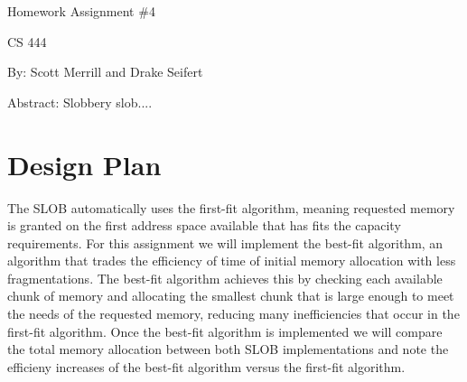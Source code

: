 \documentclass[onecolumn, draftclsnofoot,10pt, compsoc]{IEEEtran}
\def \ClassName {CS 444}
\def \AuthorName {Scott Merrill and Drake Seifert}
\def \DocName {Homework Assignment \#4}
\begin{document}
\begin {titlepage}
    \begin{singlespace}
    	\hfill
        \par\vspace{.2in}
    	\centering
    	\scshape{
    		\huge \DocName \par
            \par\vspace{.2in}
            \large \ClassName \par
            
            \par\vspace{7in}
            \large By: \AuthorName\par
            \par\vspace{.2in}
            \small Abstract: Slobbery slob....
    	}
    \end{singlespace}
\end{titlepage}


\section{Design Plan}

The SLOB automatically uses the first-fit algorithm, meaning requested memory is granted on the first address space available that has fits the capacity requirements. For this assignment we will implement the best-fit algorithm, an algorithm that trades the efficiency of time of initial memory allocation with less fragmentations. The best-fit algorithm achieves this by checking each available chunk of memory and allocating the smallest chunk that is large enough to meet the needs of the requested memory, reducing many inefficiencies that occur in the first-fit algorithm. Once the best-fit algorithm is implemented we will compare the total memory allocation between both SLOB implementations and note the efficieny increases of the best-fit algorithm versus the first-fit algorithm.
\end{document}
